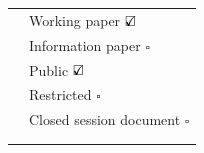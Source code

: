 \documentclass[english,11pt,a4paper,final,twoside,titlepage,pdftex]{article}
\title{\ReportTitle}
\author{\ReportAuthor}
\newcommand\CheckBoxTick{$\text{\rlap{$\checkmark$}}\square$}
\newcommand\CheckBoxUntick{$\square$}
\begin{document}
  \sloppy %


  \begin{center}
    \thispagestyle{firststyle}
    \vspace*{2cm}
    \large{\textbf{\ReportMeeting}}

    \vspace*{0.25cm}
    \large{\emph{\ReportLocation}}
		
    \vspace*{1cm}
    \large{\textbf{\ReportNumber}} \\
    \vspace*{0.5cm}	
    \huge{\ReportTitle} \\
    \vspace*{0.5cm}	
    \large{\ReportAuthor}
  \end{center}

  \begin{table}[H]
    \centering
    \begin{tabular}{|m{4cm}|m{11cm}|}
      \hline
      \textbf{\color{blue}{Document type}} & Working paper                            \CheckBoxTick   \\
                                           & Information paper                        \CheckBoxUntick \\
      \hline
      \textbf{\color{blue}{Distribution}}  & Public                                   \CheckBoxTick   \\
                                           & Restricted \footnotemark[1]              \CheckBoxUntick \\
                                           & Closed session document \footnotemark[2] \CheckBoxUntick \\
      \hline
      \multicolumn{2}{|l|}{\textbf{\color{blue}{Abstract}}} \\
      \hline
      \multicolumn{2}{|l|}{} \\
      \hline
    \end{tabular}%
  \end{table}
\end{document}
